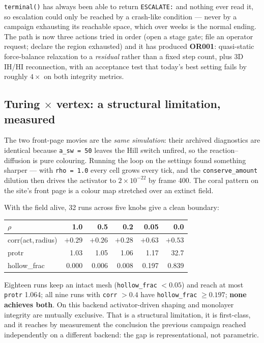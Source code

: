 \documentclass[11pt]{article}
\begin{document}
\texttt{terminal()} has always been able to return \texttt{ESCALATE:} and nothing ever read it, so
escalation could only be reached by a crash-like condition --- never by a campaign exhausting its
reachable space, which over weeks is the normal ending. The path is now three actions tried in
order (open a stage gate; file an operator request; declare the region exhausted) and it has
produced \textbf{OR001}: quasi-static force-balance relaxation to a \emph{residual} rather than a
fixed step count, plus 3D IH/HI reconnection, with an acceptance test that today's best setting
fails by roughly $4\times$ on both integrity metrics.

\subsection{Turing $\times$ vertex: a structural limitation, measured}

The two front-page movies are the \emph{same simulation}: their archived diagnostics are identical
because \texttt{a\_sw = 50} leaves the Hill switch unfired, so the reaction--diffusion is pure
colouring. Running the loop on the settings found something sharper --- with \texttt{rho = 1.0}
every cell grows every tick, and the \texttt{conserve\_amount} dilution then drives the activator
to $2\times10^{-22}$ by frame 400. The coral pattern on the site's front page is a colour map
stretched over an extinct field.

With the field alive, 32 runs across five knobs give a clean boundary:

\begin{center}
\begin{tabular}{lrrrrr}
\toprule
$\rho$ & 1.0 & 0.5 & 0.2 & 0.05 & 0.0\\
\midrule
corr(act,\,radius) & $+0.29$ & $+0.26$ & $+0.28$ & $\mathbf{+0.63}$ & $+0.53$\\
protr              & 1.03    & 1.05    & 1.06    & 1.17             & 32.7\\
hollow\_frac       & 0.000   & 0.006   & 0.008   & 0.197            & 0.839\\
\bottomrule
\end{tabular}
\end{center}

Eighteen runs keep an intact mesh (\texttt{hollow\_frac} $<0.05$) and reach at most
\texttt{protr} 1.064; all nine runs with \texttt{corr} $>0.4$ have \texttt{hollow\_frac}
$\geq 0.197$; \textbf{none achieves both}. On this backend activator-driven shaping and monolayer
integrity are mutually exclusive. That is a structural limitation, it is first-class, and it
reaches by measurement the conclusion the previous campaign reached independently on a different
backend: the gap is representational, not parametric.
\end{document}
